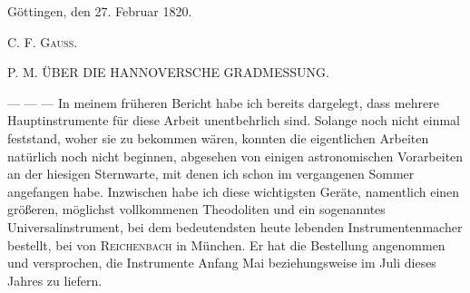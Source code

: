 Göttingen, den 27. Februar 1820.
\begin{flushright}C. F. \textsc{Gauss}.\end{flushright}

\par\bigskip{}
\begin{center}\large P. M. ÜBER DIE HANNOVERSCHE GRADMESSUNG.\end{center}
\par
— — — In meinem früheren Bericht habe ich bereits dargelegt, dass mehrere Hauptinstrumente für diese Arbeit unentbehrlich sind. Solange noch nicht einmal feststand, woher sie zu bekommen wären, konnten die eigentlichen Arbeiten natürlich noch nicht beginnen, abgesehen von einigen astronomischen Vorarbeiten an der hiesigen Sternwarte, mit denen ich schon im vergangenen Sommer angefangen habe. Inzwischen habe ich diese wichtigsten Geräte, namentlich einen größeren, möglichst vollkommenen Theodoliten und ein sogenanntes Universalinstrument, bei dem bedeutendsten heute lebenden Instrumentenmacher bestellt, bei von \textsc{Reichenbach} in München. Er hat die Bestellung angenommen und versprochen, die Instrumente Anfang Mai beziehungsweise im Juli dieses Jahres zu liefern.
